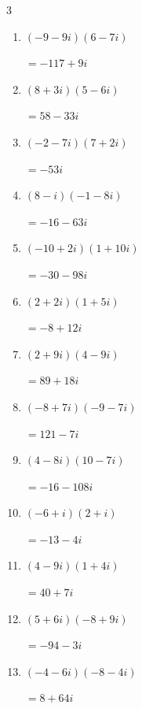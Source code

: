 \begin{multicols}{3}
\begin{enumerate}
        $\displaystyle =52-52i$

\columnbreak %

  \item $\displaystyle (-9-9i)(6-7i)$

        $\displaystyle =-117+9i$

  \item $\displaystyle (8+3i)(5-6i)$

        $\displaystyle =58-33i$

  \item $\displaystyle (-2-7i)(7+2i)$

        $\displaystyle =-53i$

  \item $\displaystyle (8-i)(-1-8i)$

        $\displaystyle =-16-63i$

  \item $\displaystyle (-10+2i)(1+10i)$

        $\displaystyle =-30-98i$

  \item $\displaystyle (2+2i)(1+5i)$

        $\displaystyle =-8+12i$

  \item $\displaystyle (2+9i)(4-9i)$

        $\displaystyle =89+18i$

  \item $\displaystyle (-8+7i)(-9-7i)$

        $\displaystyle =121-7i$

  \item $\displaystyle (4-8i)(10-7i)$

        $\displaystyle =-16-108i$

  \item $\displaystyle (-6+i)(2+i)$

        $\displaystyle =-13-4i$

  \item $\displaystyle (4-9i)(1+4i)$

        $\displaystyle =40+7i$

  \item $\displaystyle (5+6i)(-8+9i)$

        $\displaystyle =-94-3i$

  \item $\displaystyle (-4-6i)(-8-4i)$

        $\displaystyle =8+64i$


\end{enumerate}
\end{multicols}
